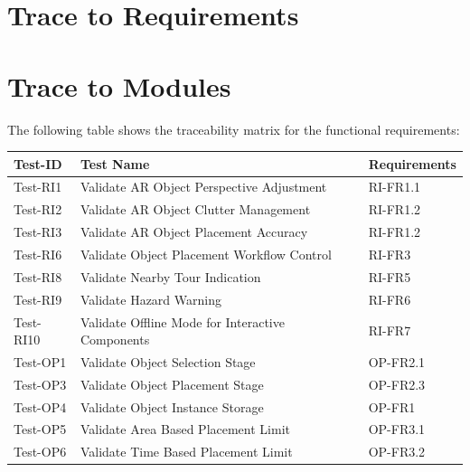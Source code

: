 \documentclass[12pt, titlepage]{article}
\begin{document}
\section{Trace to Requirements}

\section{Trace to Modules}
The following table shows the traceability matrix for the functional requirements:

\begin{table}[htpb!]
  \centering
  \begin{tabular}{|l|p{8cm}|p{3cm}|}
    \hline
    \textbf{Test-ID} & \textbf{Test Name}                                 & \textbf{Requirements} \\
    \hline
    Test-RI1         & Validate AR Object Perspective Adjustment          & RI-FR1.1              \\
    \hline
    Test-RI2         & Validate AR Object Clutter Management              & RI-FR1.2              \\
    \hline
    Test-RI3         & Validate AR Object Placement Accuracy              & RI-FR1.2              \\
    \hline
    Test-RI6         & Validate Object Placement Workflow Control         & RI-FR3                \\
    \hline
    Test-RI8         & Validate Nearby Tour Indication                    & RI-FR5                \\
    \hline
    Test-RI9         & Validate Hazard Warning                            & RI-FR6                \\
    \hline
    Test-RI10        & Validate Offline Mode for Interactive Components   & RI-FR7                \\
    \hline
    Test-OP1         & Validate Object Selection Stage                    & OP-FR2.1              \\
    \hline
    Test-OP3         & Validate Object Placement Stage                    & OP-FR2.3              \\
    \hline
    Test-OP4         & Validate Object Instance Storage                   & OP-FR1                \\
    \hline
    Test-OP5         & Validate Area Based Placement Limit                & OP-FR3.1              \\
    \hline
    Test-OP6         & Validate Time Based Placement Limit                & OP-FR3.2              \\

\end{tabular}
\end{table}
\end{document}
